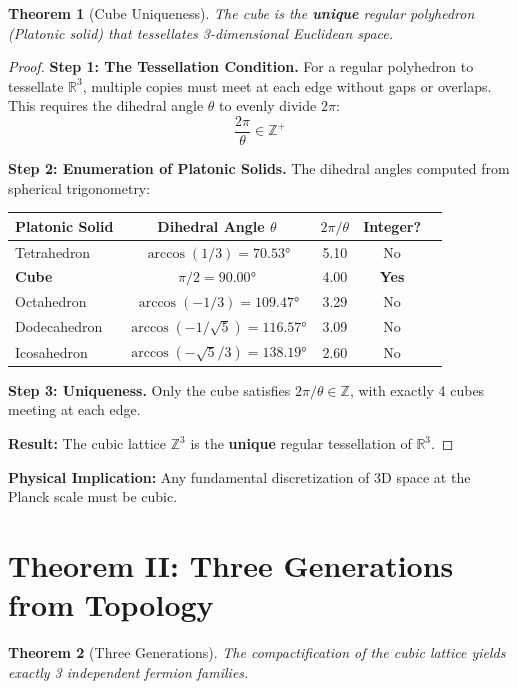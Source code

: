 \documentclass[11pt,a4paper]{article}
\theoremstyle{plain}
\newtheorem{theorem}{Theorem}[section]
\theoremstyle{definition}
\theoremstyle{remark}
\begin{document}
\begin{theorem}[Cube Uniqueness]
The cube is the \textbf{unique} regular polyhedron (Platonic solid) that tessellates 3-dimensional Euclidean space.
\end{theorem}

\begin{proof}
\textbf{Step 1: The Tessellation Condition.} For a regular polyhedron to tessellate $\mathbb{R}^3$, multiple copies must meet at each edge without gaps or overlaps. This requires the dihedral angle $\theta$ to evenly divide $2\pi$:
\[
\frac{2\pi}{\theta} \in \mathbb{Z}^+
\]

\textbf{Step 2: Enumeration of Platonic Solids.} The dihedral angles computed from spherical trigonometry:

\begin{center}
\begin{tabular}{lcccc}
\toprule
\textbf{Platonic Solid} & \textbf{Dihedral Angle} $\theta$ & $2\pi/\theta$ & \textbf{Integer?} \\
\midrule
Tetrahedron & $\arccos(1/3) = 70.53°$ & 5.10 & No \\
\textbf{Cube} & $\pi/2 = 90.00°$ & 4.00 & \textbf{Yes} \\
Octahedron & $\arccos(-1/3) = 109.47°$ & 3.29 & No \\
Dodecahedron & $\arccos(-1/\sqrt{5}) = 116.57°$ & 3.09 & No \\
Icosahedron & $\arccos(-\sqrt{5}/3) = 138.19°$ & 2.60 & No \\
\bottomrule
\end{tabular}
\end{center}

\textbf{Step 3: Uniqueness.} Only the cube satisfies $2\pi/\theta \in \mathbb{Z}$, with exactly 4 cubes meeting at each edge.

\textbf{Result:} The cubic lattice $\mathbb{Z}^3$ is the \textbf{unique} regular tessellation of $\mathbb{R}^3$.
\end{proof}

\textbf{Physical Implication:} Any fundamental discretization of 3D space at the Planck scale must be cubic.

\section{Theorem II: Three Generations from Topology}

\begin{theorem}[Three Generations]
The compactification of the cubic lattice yields exactly 3 independent fermion families.
\end{theorem}
\end{document}
